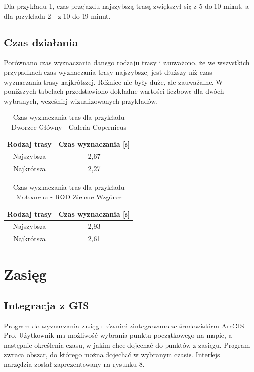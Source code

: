 \documentclass{article}
\begin{document}
Dla przykładu 1, czas przejazdu najszybszą trasą zwiększył się z 5 do 10 minut, a dla przykładu 2 - z 10 do 19 minut.

\subsection{Czas działania}
Porównano czas wyznaczania danego rodzaju trasy i zauważono, że we wszystkich przypadkach czas wyznaczania trasy najszybszej jest dłuższy niż czas wyznaczania trasy najkrótszej.
Różnice nie były duże, ale zauważalne. W poniższych tabelach przedstawiono dokładne wartości liczbowe dla dwóch wybranych, wcześniej wizualizowanych przykładów.\\

\begin{table}[H]
\centering
\begin{tabular}{|c|c|}
\hline
Rodzaj trasy & Czas wyznaczania [s] \\
\hline
Najszybsza & 2,67 \\
\hline
Najkrótsza & 2,27 \\
\hline
\end{tabular}
\caption{Czas wyznaczania tras dla przykładu Dworzec Główny - Galeria Copernicus}
\end{table}

\begin{table}[H]
\centering
\begin{tabular}{|c|c|}
\hline
Rodzaj trasy & Czas wyznaczania [s] \\
\hline
Najszybsza & 2,93 \\
\hline
Najkrótsza & 2,61 \\
\hline
\end{tabular}
\caption{Czas wyznaczania tras dla przykładu Motoarena - ROD Zielone Wzgórze}
\end{table}

\section{Zasięg}
\subsection{Integracja z GIS}
Program do wyznaczania zasięgu również zintegrowano ze środowiskiem ArcGIS Pro. Użytkownik ma możliwość wybrania punktu początkowego na mapie, a następnie określenia czasu, w jakim chce dojechać do punktów z zasięgu. Program zwraca obszar, do którego można dojechać w wybranym czasie. Interfejs narzędzia został zaprezentowany na rysunku 8.
\end{document}
